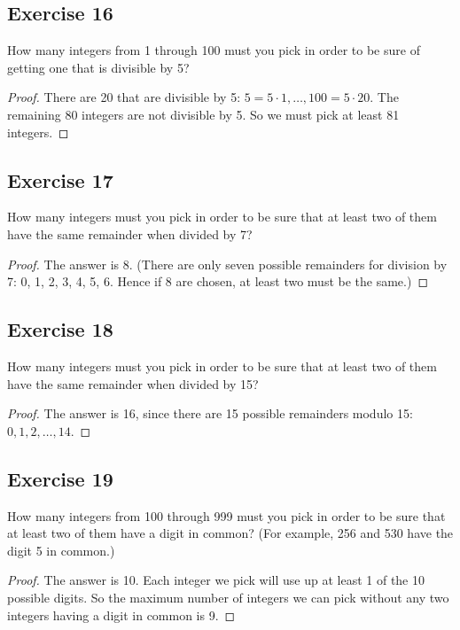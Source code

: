 \documentclass[14pt]{extarticle}
\begin{document}
\subsection{Exercise 16}
How many integers from 1 through 100 must you pick in order to be sure of getting one that is divisible by 5?

\begin{proof}
There are 20 that are divisible by 5: \(5 = 5 \cdot 1, \ldots, 100 = 5 \cdot 20\). The remaining 80 integers are
not divisible by 5. So we must pick at least 81 integers.
\end{proof}

\subsection{Exercise 17}
How many integers must you pick in order to be sure that at least two of them have the same remainder when divided by 7?

\begin{proof}
The answer is 8. (There are only seven possible remainders for division by 7: 0, 1, 2, 3, 4, 5, 6. Hence if 8 are 
chosen, at least two must be the same.)
\end{proof}

\subsection{Exercise 18}
How many integers must you pick in order to be sure that at least two of them have the same remainder when divided by 15?

\begin{proof}
The answer is 16, since there are 15 possible remainders modulo 15: \(0, 1, 2, \ldots, 14\).
\end{proof}

\subsection{Exercise 19}
How many integers from 100 through 999 must you pick in order to be sure that at least two of them have a digit in 
common? (For example, 256 and 530 have the digit 5 in common.)

\begin{proof}
The answer is 10. Each integer we pick will use up at least 1 of the 10 possible digits. So the maximum number of 
integers we can pick without any two integers having a digit in common is 9. 
\end{proof}
\end{document}

